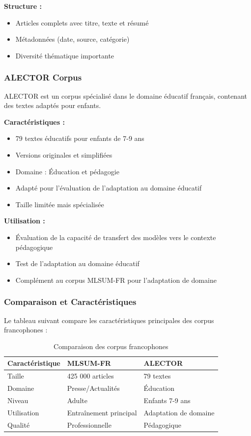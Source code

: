 \textbf{Structure :}
\begin{itemize}
    \item Articles complets avec titre, texte et résumé
    \item Métadonnées (date, source, catégorie)
    \item Diversité thématique importante
\end{itemize}

\subsubsection{ALECTOR Corpus}

ALECTOR est un corpus spécialisé dans le domaine éducatif français, contenant des textes adaptés pour enfants.

\textbf{Caractéristiques :}
\begin{itemize}
    \item 79 textes éducatifs pour enfants de 7-9 ans
    \item Versions originales et simplifiées
    \item Domaine : Éducation et pédagogie
    \item Adapté pour l'évaluation de l'adaptation au domaine éducatif
    \item Taille limitée mais spécialisée
\end{itemize}

\textbf{Utilisation :}
\begin{itemize}
    \item Évaluation de la capacité de transfert des modèles vers le contexte pédagogique
    \item Test de l'adaptation au domaine éducatif
    \item Complément au corpus MLSUM-FR pour l'adaptation de domaine
\end{itemize}

\subsubsection{Comparaison et Caractéristiques}

Le tableau suivant compare les caractéristiques principales des corpus francophones :

\begin{table}[h]
\centering
\begin{tabular}{|l|p{5cm}|p{5cm}|}
\hline
\textbf{Caractéristique} & \textbf{MLSUM-FR} & \textbf{ALECTOR} \\
\hline
Taille & 425 000 articles & 79 textes \\
\hline
Domaine & Presse/Actualités & Éducation \\
\hline
Niveau & Adulte & Enfants 7-9 ans \\
\hline
Utilisation & Entraînement principal & Adaptation de domaine \\
\hline
Qualité & Professionnelle & Pédagogique \\
\hline
\end{tabular}
\caption{Comparaison des corpus francophones}
\end{table}

